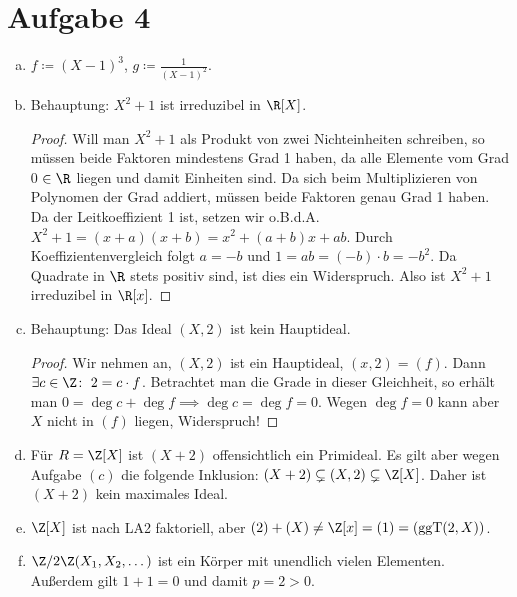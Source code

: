\documentclass{article}
\begin{document}
    \section*{Aufgabe 4}
    \begin{enumerate}[(a)]
        \item $f \coloneqq (X -1)^3$, $g \coloneqq \frac{1}{(X-1)^2}$.
        \item Behauptung: $X^2 + 1$ ist irreduzibel in $\R[X]$. 
        \begin{proof}
            Will man $X^2 + 1$ als Produkt von zwei Nichteinheiten schreiben, so müssen beide Faktoren mindestens Grad 1 haben, da alle Elemente vom Grad 0 $\in \R$ liegen und damit Einheiten sind. Da sich beim Multiplizieren von Polynomen der Grad addiert, müssen beide Faktoren genau Grad 1 haben. Da der Leitkoeffizient 1 ist, setzen wir o.B.d.A. $X^2 + 1 = (x + a)(x + b) = x^2 + (a + b)x + ab$. Durch Koeffizientenvergleich folgt $a = -b$ und $1 = ab = (-b) \cdot b = -b^2$. Da Quadrate in $\R$ stets positiv sind, ist dies ein Widerspruch. Also ist $X^2 + 1$ irreduzibel in $\R[x]$.
        \end{proof}
        \item Behauptung: Das Ideal $(X,2)$ ist kein Hauptideal.
        \begin{proof}
            Wir nehmen an, $(X,2)$ ist ein Hauptideal, $(x, 2) = (f)$. Dann $\exists c\in \Z\colon\;2 = c\cdot f$. Betrachtet man die Grade in dieser Gleichheit, so erhält man $0 = \deg c + \deg f \implies \deg c = \deg f = 0$. Wegen $\deg f = 0$ kann aber $X$ nicht in $(f)$ liegen, Widerspruch!
        \end{proof}
        \item Für $R = \Z[X]$ ist $(X + 2)$ offensichtlich ein Primideal. Es gilt aber wegen Aufgabe $(c)$ die folgende Inklusion: $(X + 2) \subsetneq (X,2) \subsetneq \Z[X]$. Daher ist $(X + 2)$ kein maximales Ideal.
        \item $\Z[X]$ ist nach LA2 faktoriell, aber $(2) + (X) \neq \Z[x] = (1) = (\operatorname{ggT}(2, X))$.
        \item $\Z/2\Z(X_1,X_2,\dots)$ ist ein Körper mit unendlich vielen Elementen. Außerdem gilt $1 + 1 = 0$ und damit $p = 2 > 0$.
    \end{enumerate}
\end{document}
